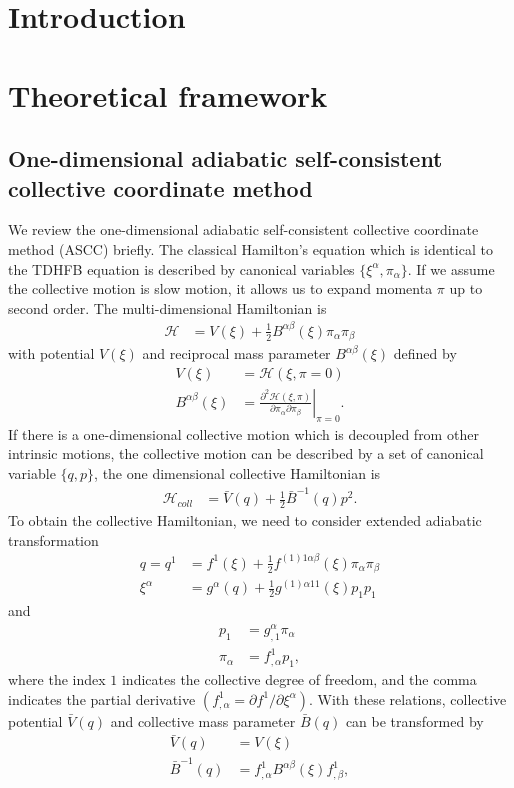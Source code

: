 \documentclass[%
superscriptaddress,
showpacs,
nofootinbib,
amsmath,amssymb,
aps,
prc,
twocolumn,
floatfix ]%
{revtex4-1}
\begin{document}
\section{Introduction}


\section{Theoretical framework}

\subsection{One-dimensional adiabatic self-consistent collective coordinate method}
\label{ASCC}

We review the one-dimensional adiabatic self-consistent collective coordinate method (ASCC) briefly. The classical Hamilton's equation which is identical to the TDHFB equation is described by canonical variables $\{\xi^{\alpha},\pi_{\alpha}\}$. If we assume the collective motion is slow motion, it allows us to expand momenta $\pi$ up to second order. The multi-dimensional Hamiltonian is
\begin{align}
  \mathcal{H} &= V(\xi) + \frac{1}{2}B^{\alpha\beta}(\xi)\pi_{\alpha}\pi_{\beta}
\end{align}
with potential $V(\xi)$ and reciprocal mass parameter $B^{\alpha\beta}(\xi)$ defined by
\begin{align}
  V(\xi) &= \mathcal{H}(\xi,\pi=0) \\
  B^{\alpha\beta}(\xi) &= \left. \frac{\partial^2\mathcal{H}(\xi,\pi)}{\partial\pi_{\alpha}\partial\pi_{\beta}} \right|_{\pi=0}.
\end{align}
 If there is a one-dimensional collective motion which is decoupled from other intrinsic motions, the collective motion can be described by a set of canonical variable $\{q,p\}$, the one dimensional collective Hamiltonian is
\begin{align}
  \mathcal{H}_{coll} &= \bar{V}(q) + \frac{1}{2}\bar{B}^{-1}(q)p^2.
  \label{coll}
\end{align}
To obtain the collective Hamiltonian, we need to consider extended adiabatic transformation
\begin{align}
  q = q^1 &= f^1(\xi) + \frac{1}{2}f^{(1)1\alpha\beta}(\xi)\pi_{\alpha}\pi_{\beta}  \label{point}\\
 \xi^{\alpha} &= g^{\alpha}(q) + \frac{1}{2}g^{(1)\alpha 1 1}(\xi)p_{1}p_{1}
\end{align}
and
\begin{align}
  p_1 &= g_{,1}^{\alpha}\pi_{\alpha} \\
 \pi_{\alpha} &= f^1_{,\alpha}p_1 ,
  \label{momenta}
\end{align}
where the index $1$ indicates the collective degree of freedom, and the comma indicates the partial derivative $(f^1_{,\alpha}=\partial f^1/\partial \xi^{\alpha})$. 
With these relations, collective potential $\bar{V}(q)$ and collective mass parameter $\bar{B}(q)$ can be transformed by
\begin{align}
  \bar{V}(q) &= V(\xi) \\
  \bar{B}^{-1}(q) &= f^1_{,\alpha}B^{\alpha\beta}(\xi)f^1_{,\beta} ,
  \label{coll_mass}
\end{align}
\end{document}
